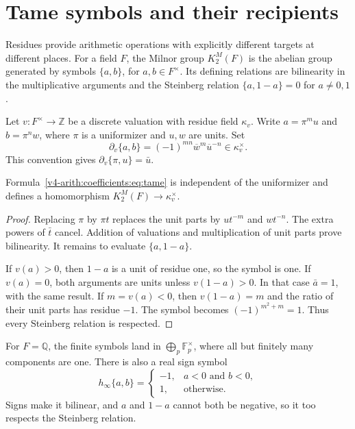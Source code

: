 \section{Tame symbols and their recipients}
\label{v4-arith:coefficients:sec:symbols}

Residues provide arithmetic operations with explicitly different
targets at different places. For a field \(F\), the Milnor group
\(K^M_2(F)\) is the abelian group generated by symbols
\(\{a,b\}\), for \(a,b\in F^\times\). Its defining relations
are bilinearity in the multiplicative arguments and the Steinberg
relation \(\{a,1-a\}=0\) for \(a\ne0,1\).

Let \(v:F^\times\to\mathbb Z\)
be a discrete valuation with residue field \(\kappa_v\).
Write \(a=\pi^m u\) and \(b=\pi^n w\), where \(\pi\) is a
uniformizer and \(u,w\) are units. Set
\begin{equation}\label{v4-arith:coefficients:eq:tame}
 \partial_v\{a,b\}=(-1)^{mn}\overline{w}^{m}
                                  \overline{u}^{-n}
 \in\kappa_v^\times.
\end{equation}
This convention gives \(\partial_v\{\pi,u\}=\bar u\).

\begin{proposition}\label{v4-arith:coefficients:prop:tame}
Formula~\eqref{v4-arith:coefficients:eq:tame} is independent of
the uniformizer and defines a homomorphism
\(K^M_2(F)\to\kappa_v^\times\).
\end{proposition}
\begin{proof}
Replacing \(\pi\) by \(\pi t\) replaces the unit parts by
\(ut^{-m}\) and \(wt^{-n}\). The extra powers of \(\bar t\)
cancel. Addition of valuations and multiplication of unit parts
prove bilinearity. It remains to evaluate \(\{a,1-a\}\).

If \(v(a)>0\), then \(1-a\) is a unit of residue one, so the
symbol is one. If \(v(a)=0\), both arguments are units unless
\(v(1-a)>0\). In that case \(\bar a=1\), with the same result.
If \(m=v(a)<0\), then \(v(1-a)=m\) and the ratio of their
unit parts has residue \(-1\). The symbol becomes
\((-1)^{m^2+m}=1\). Thus every Steinberg relation is respected.
\end{proof}

For \(F=\mathbb Q\), the finite symbols land in
\(\bigoplus_p\mathbb F_p^\times\), where all but finitely many
components are one. There is also a real sign symbol
\[
 h_\infty\{a,b\}=
 \begin{cases}-1,&a<0\text{ and }b<0,\\1,&\text{otherwise}.
 \end{cases}
\]
Signs make it bilinear, and \(a\) and \(1-a\) cannot both be
negative, so it too respects the Steinberg relation.

